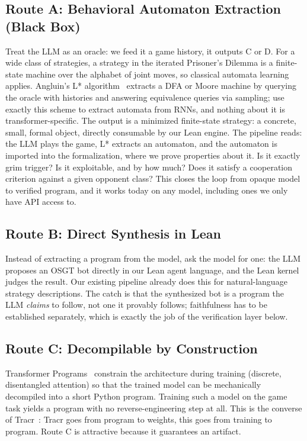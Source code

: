 \documentclass{article}
\begin{document}
\subsection{Route A: Behavioral Automaton Extraction (Black Box)}
Treat the LLM as an oracle: we feed it a game history, it outputs C or D. For a wide class of strategies, a strategy in the iterated Prisoner's Dilemma is a finite-state machine over the alphabet of joint moves, so classical automata learning applies. Angluin's L* algorithm~\parencite{angluin1987learning} extracts a DFA or Moore machine by querying the oracle with histories and answering equivalence queries via sampling; \textcite{weiss2018extracting} use exactly this scheme to extract automata from RNNs, and nothing about it is transformer-specific. The output is a minimized finite-state strategy: a concrete, small, formal object, directly consumable by our Lean engine. The pipeline reads: the LLM plays the game, L* extracts an automaton, and the automaton is imported into the formalization, where we prove properties about it. Is it exactly grim trigger? Is it exploitable, and by how much? Does it satisfy a cooperation criterion against a given opponent class? This closes the loop from opaque model to verified program, and it works today on any model, including ones we only have API access to.

\subsection{Route B: Direct Synthesis in Lean}
Instead of extracting a program from the model, ask the model for one: the LLM proposes an OSGT bot directly in our Lean agent language, and the Lean kernel judges the result. Our existing pipeline already does this for natural-language strategy descriptions. The catch is that the synthesized bot is a program the LLM \emph{claims} to follow, not one it provably follows; faithfulness has to be established separately, which is exactly the job of the verification layer below.

\subsection{Route C: Decompilable by Construction}
Transformer Programs~\parencite{friedman2023transformerprograms} constrain the architecture during training (discrete, disentangled attention) so that the trained model can be mechanically decompiled into a short Python program. Training such a model on the game task yields a program with no reverse-engineering step at all. This is the converse of Tracr~\parencite{lindner2023tracr}: Tracr goes from program to weights, this goes from training to program. Route C is attractive because it guarantees an artifact.
\end{document}
